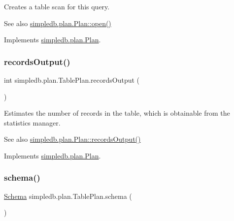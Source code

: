 Creates a table scan for this query. \begin{DoxySeeAlso}{See also}
\hyperlink{interfacesimpledb_1_1plan_1_1Plan_aaa4c15cda4e9c0d52308850f9f13ff99}{simpledb.\+plan.\+Plan\+::open()} 
\end{DoxySeeAlso}


Implements \hyperlink{interfacesimpledb_1_1plan_1_1Plan_aaa4c15cda4e9c0d52308850f9f13ff99}{simpledb.\+plan.\+Plan}.

\mbox{\label{classsimpledb_1_1plan_1_1TablePlan_ab55d872332c11cd882240f8b1851abc6}} 
\subsubsection{\texorpdfstring{records\+Output()}{recordsOutput()}}
{\footnotesize\ttfamily int simpledb.\+plan.\+Table\+Plan.\+records\+Output (\begin{DoxyParamCaption}{ }\end{DoxyParamCaption})\hspace{0.3cm}{\ttfamily [inline]}}

Estimates the number of records in the table, which is obtainable from the statistics manager. \begin{DoxySeeAlso}{See also}
\hyperlink{interfacesimpledb_1_1plan_1_1Plan_a187e06657d356c80a7f743d7ff8fd257}{simpledb.\+plan.\+Plan\+::records\+Output()} 
\end{DoxySeeAlso}


Implements \hyperlink{interfacesimpledb_1_1plan_1_1Plan_a187e06657d356c80a7f743d7ff8fd257}{simpledb.\+plan.\+Plan}.

\mbox{\label{classsimpledb_1_1plan_1_1TablePlan_aeceae838a8fdc6dedfd23e8175374510}} 
\subsubsection{\texorpdfstring{schema()}{schema()}}
{\footnotesize\ttfamily \hyperlink{classsimpledb_1_1record_1_1Schema}{Schema} simpledb.\+plan.\+Table\+Plan.\+schema (\begin{DoxyParamCaption}{ }\end{DoxyParamCaption})\hspace{0.3cm}{\ttfamily [inline]}}

